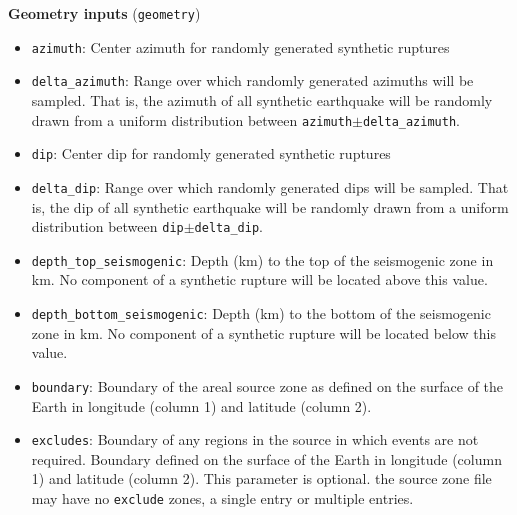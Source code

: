 \textbf{Geometry inputs} (\texttt{geometry})
\begin{itemize}
\item \texttt{azimuth}: Center azimuth for randomly generated synthetic ruptures 
\item \texttt{delta\_azimuth}: Range over which randomly generated azimuths will
be sampled. That is, the azimuth of all synthetic earthquake will be randomly drawn
from a uniform distribution between \texttt{azimuth}$\pm$\texttt{delta\_azimuth}. 
\item \texttt{dip}: Center dip for randomly generated synthetic ruptures 
\item \texttt{delta\_dip}: Range over which randomly generated dips will
be sampled. That is, the dip of all synthetic earthquake will be
randomly drawn from a uniform distribution between \texttt{dip}$\pm$\texttt{delta\_dip}.
\item \texttt{depth\_top\_seismogenic}: Depth (km) to the top of the seismogenic zone in km.
No component of a synthetic rupture will be located above this value. 
\item \texttt{depth\_bottom\_seismogenic}: Depth (km) to the bottom of the seismogenic zone in km.
No component of a synthetic rupture will be located below this value. 
\item \texttt{boundary}: Boundary of the areal source zone as
defined on the surface of the Earth in longitude (column 1) and
latitude (column 2). 
\item \texttt{excludes}: Boundary of any regions in the source in
which events are not required. Boundary defined on the surface of
the Earth in longitude (column 1) and latitude (column 2). This parameter 
is optional. the source zone file may have no \texttt{exclude} zones, a single 
entry or multiple entries.
\end{itemize}

